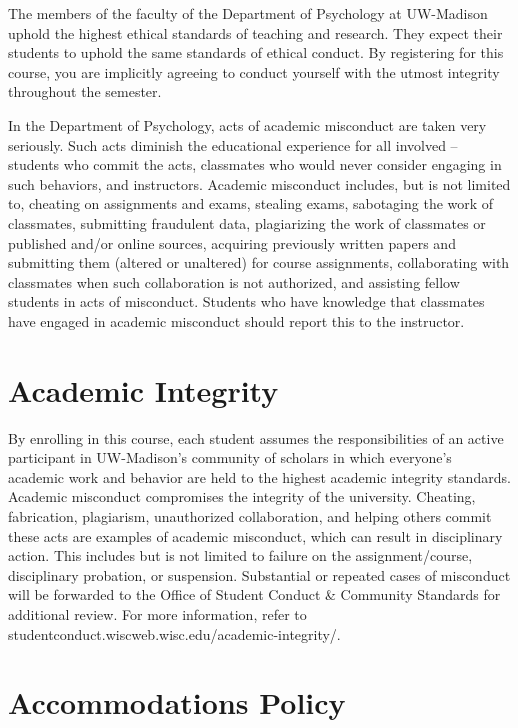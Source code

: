 \documentclass[11pt,man]{article}
\begin{document}
The members of the faculty of the Department of Psychology at UW-Madison
uphold the highest ethical standards of teaching and research. They
expect their students to uphold the same standards of ethical conduct.
By registering for this course, you are implicitly agreeing to conduct
yourself with the utmost integrity throughout the semester.

In the Department of Psychology, acts of academic misconduct are taken
very seriously. Such acts diminish the educational experience for all
involved -- students who commit the acts, classmates who would never
consider engaging in such behaviors, and instructors. Academic
misconduct includes, but is not limited to, cheating on assignments and
exams, stealing exams, sabotaging the work of classmates, submitting
fraudulent data, plagiarizing the work of classmates or published and/or
online sources, acquiring previously written papers and submitting them
(altered or unaltered) for course assignments, collaborating with
classmates when such collaboration is not authorized, and assisting
fellow students in acts of misconduct. Students who have knowledge that
classmates have engaged in academic misconduct should report this to the
instructor.

\hypertarget{academic-integrity}{%
\section{Academic Integrity}\label{academic-integrity}}

By enrolling in this course, each student assumes the responsibilities
of an active participant in UW-Madison's community of scholars in which
everyone's academic work and behavior are held to the highest academic
integrity standards. Academic misconduct compromises the integrity of
the university. Cheating, fabrication, plagiarism, unauthorized
collaboration, and helping others commit these acts are examples of
academic misconduct, which can result in disciplinary action. This
includes but is not limited to failure on the assignment/course,
disciplinary probation, or suspension. Substantial or repeated cases of
misconduct will be forwarded to the Office of Student Conduct \&
Community Standards for additional review. For more information, refer
to studentconduct.wiscweb.wisc.edu/academic-integrity/.

\hypertarget{accommodations-policy}{%
\section{Accommodations Policy}\label{accommodations-policy}}
\end{document}
